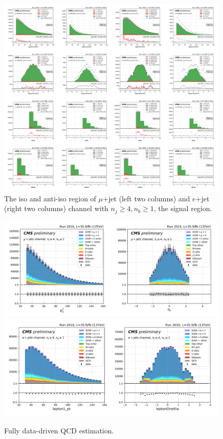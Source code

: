 \begin{figure}
    \centering
    \includegraphics[width=0.99\textwidth]{chapters/Analysis/sectionBackground/figures/ljets_kinematics/4j1b.png}
    \caption{The iso and anti-iso region of $\mu$+jet (left two columns) and $e$+jet (right two columns) channel 
    with $n_j\geq4,n_b\geq1$, the signal region.}
    \label{fig:appendix:4j1b}
\end{figure}




\begin{figure}
    \centering
    \includegraphics[width=0.99\textwidth]{chapters/Analysis/sectionBackground/figures/ljets_application/ddNorm_ddShape_mu4j.png}
    \includegraphics[width=0.99\textwidth]{chapters/Analysis/sectionBackground/figures/ljets_application/ddNorm_ddShape_e4j.png}
    \caption{Fully data-driven QCD estimation.}
    \label{fig:app:QCD:application_SFNorm_ddShape}
\end{figure}

